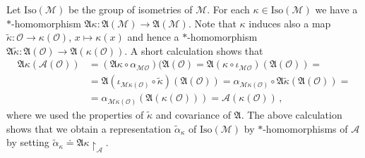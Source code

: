 \documentclass[12pt]{article}
\newcommand{\fA}{\mathfrak{A}}
\newcommand{\Mcal}{\mathcal{M}}
\newcommand{\Ocal}{\mathcal{O}}
\newcommand{\Acal}{\mathcal{A}}
\newcommand{\al}{\alpha}
\newcommand{\1}{\mathds{1}}                         %
\begin{document}
{ Let $\mathrm{Iso}(\Mcal)$ be the group of isometries of $\Mcal$. For each  $\kappa\in\mathrm{Iso}(\Mcal)$ we have a $*$-homomorphism $\fA\kappa:\fA(\Mcal)\rightarrow \fA(\Mcal)$. Note that $\kappa$ induces also a map $\tilde{\kappa}:\Ocal\rightarrow \kappa(\Ocal)$, $x\mapsto \kappa(x)$ and hence a $*$-homomorphism $\fA\tilde{\kappa}:\fA(\Ocal)\rightarrow \fA(\kappa(\Ocal))$. A short calculation shows that
\begin{align*}
\fA\kappa(\Acal(\Ocal))&=(\fA\kappa\circ\al_{\Mcal\Ocal})(\fA(\Ocal)=\fA({\kappa\circ\iota_{\Mcal\Ocal}})(\fA(\Ocal))=\\
&=\fA({\iota_{\Mcal\kappa(\Ocal)}\circ\tilde{\kappa}})(\fA(\Ocal))=\al_{\Mcal\kappa(\Ocal)}\circ\fA{\tilde{\kappa}}(\fA(\Ocal))=\\
&=\al_{\Mcal\kappa(\Ocal)}(\fA(\kappa(\Ocal)))=\Acal(\kappa(\Ocal))\,,
\end{align*}
where we used the properties of $\tilde{\kappa}$ and covariance of $\fA$. The above calculation shows that we obtain a representation $\tilde{\al}_\kappa$ of $\mathrm{Iso}(\Mcal)$ by  $*$-homomorphisms of $\Acal$ by setting $\tilde{\al}_\kappa\doteq\fA\kappa\upharpoonright_{\Acal}$.

}
\end{document}
